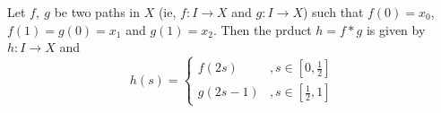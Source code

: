 \begin{definition}
	Let $f,\ g$ be two paths in $X$ (ie, $f : I \to X$ and $g: I \to X$) such that $f(0)=x_0$, $f(1)=g(0)=x_1$ and $g(1)=x_2$. Then the prduct $h = f \ast g$ is given by $h : I \to X$ and \[ h(s) = \begin{cases} f(2s) & , s \in [0,\frac{1}{2}] \\ g(2s-1) & , s \in [\frac{1}{2},1] \end{cases} \]
\end{definition}




